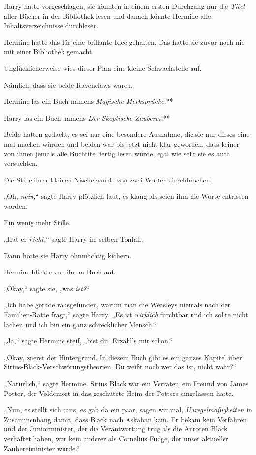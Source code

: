 {Harry hatte vorgeschlagen, sie könnten in einem ersten Durchgang nur die \emph{Titel} aller Bücher in der Bibliothek lesen und danach könnte Hermine alle Inhaltsverzeichnisse durchlesen.

Hermine hatte das für eine brillante Idee gehalten. Das hatte sie zuvor noch nie mit einer Bibliothek gemacht.

Unglücklicherweise wies dieser Plan eine kleine Schwachstelle auf.

Nämlich, dass sie beide Ravenclaws waren.

Hermine las ein Buch namens \emph{Magische Merksprüche.}**

Harry las ein Buch namens \emph{Der Skeptische Zauberer.}**

Beide hatten gedacht, es sei nur eine besondere Ausnahme, die sie nur dieses eine mal machen würden und beiden war bis jetzt nicht klar geworden, dass keiner von ihnen jemals alle Buchtitel fertig lesen würde, egal wie sehr sie es auch versuchten.

Die Stille ihrer kleinen Nische wurde von zwei Worten durchbrochen.

„Oh, \emph{nein,}“ sagte Harry plötzlich laut, es klang als seien ihm die Worte entrissen worden.

Ein wenig mehr Stille.

„Hat er \emph{nicht,}“ sagte Harry im selben Tonfall.

Dann hörte sie Harry ohnmächtig kichern.

Hermine blickte von ihrem Buch auf.

„Okay,“ sagte sie, „was \emph{ist?}“

„Ich habe gerade rausgefunden, warum man die Weasleys niemals nach der Familien-Ratte fragt,“ sagte Harry. „Es ist \emph{wirklich} furchtbar und ich sollte nicht lachen und ich bin ein ganz schrecklicher Mensch.“

„Ja,“ sagte Hermine steif, „bist du. Erzähl's mir schon.“

„Okay, zuerst der Hintergrund. In diesem Buch gibt es ein ganzes Kapitel über Sirius-Black-Verschwörungstheorien. Du weißt noch wer das ist, nicht wahr?“

„Natürlich,“ sagte Hermine. Sirius Black war ein Verräter, ein Freund von James Potter, der Voldemort in das geschützte Heim der Potters eingelassen hatte.

„Nun, es stellt sich raus, es gab da ein paar, sagen wir mal, \emph{Unregelmäßigkeiten} in Zusammenhang damit, dass Black nach Askaban kam. Er bekam kein Verfahren und der Juniorminister, der die Verantwortung trug als die Auroren Black verhaftet haben, war kein anderer als Cornelius Fudge, der unser aktueller Zaubereiminister wurde.“

}

